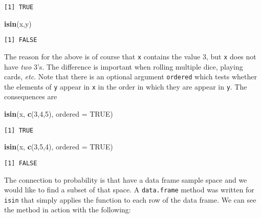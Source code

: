 \documentclass[]{book}
\newenvironment{Shaded}{\begin{snugshade}}{\end{snugshade}}
\newcommand{\KeywordTok}[1]{\textcolor[rgb]{0.13,0.29,0.53}{\textbf{{#1}}}}
\newcommand{\DataTypeTok}[1]{\textcolor[rgb]{0.13,0.29,0.53}{{#1}}}
\newcommand{\DecValTok}[1]{\textcolor[rgb]{0.00,0.00,0.81}{{#1}}}
\newcommand{\OtherTok}[1]{\textcolor[rgb]{0.56,0.35,0.01}{{#1}}}
\newcommand{\NormalTok}[1]{{#1}}
\numberwithin{equation}{chapter}
\numberwithin{figure}{chapter}
\theoremstyle{plain}
\theoremstyle{definition}
\theoremstyle{remark}
\theoremstyle{definition}
\theoremstyle{definition}
\theoremstyle{remark}
\begin{document}
\begin{verbatim}
[1] TRUE
\end{verbatim}

\begin{Shaded}
\begin{Highlighting}[]
\KeywordTok{isin}\NormalTok{(x,y) }
\end{Highlighting}
\end{Shaded}

\begin{verbatim}
[1] FALSE
\end{verbatim}

The reason for the above is of course that \texttt{x} contains the value
3, but \texttt{x} does not have \emph{two} 3's. The difference is
important when rolling multiple dice, playing cards, \emph{etc}. Note
that there is an optional argument \texttt{ordered} which tests whether
the elements of \texttt{y} appear in \texttt{x} in the order in which
they are appear in \texttt{y}. The consequences are

\begin{Shaded}
\begin{Highlighting}[]
\KeywordTok{isin}\NormalTok{(x, }\KeywordTok{c}\NormalTok{(}\DecValTok{3}\NormalTok{,}\DecValTok{4}\NormalTok{,}\DecValTok{5}\NormalTok{), }\DataTypeTok{ordered =} \OtherTok{TRUE}\NormalTok{) }
\end{Highlighting}
\end{Shaded}

\begin{verbatim}
[1] TRUE
\end{verbatim}

\begin{Shaded}
\begin{Highlighting}[]
\KeywordTok{isin}\NormalTok{(x, }\KeywordTok{c}\NormalTok{(}\DecValTok{3}\NormalTok{,}\DecValTok{5}\NormalTok{,}\DecValTok{4}\NormalTok{), }\DataTypeTok{ordered =} \OtherTok{TRUE}\NormalTok{) }
\end{Highlighting}
\end{Shaded}

\begin{verbatim}
[1] FALSE
\end{verbatim}

The connection to probability is that have a data frame sample space and
we would like to find a subset of that space. A \texttt{data.frame}
method was written for \texttt{isin} that simply applies the function to
each row of the data frame. We can see the method in action with the
following:
\end{document}
